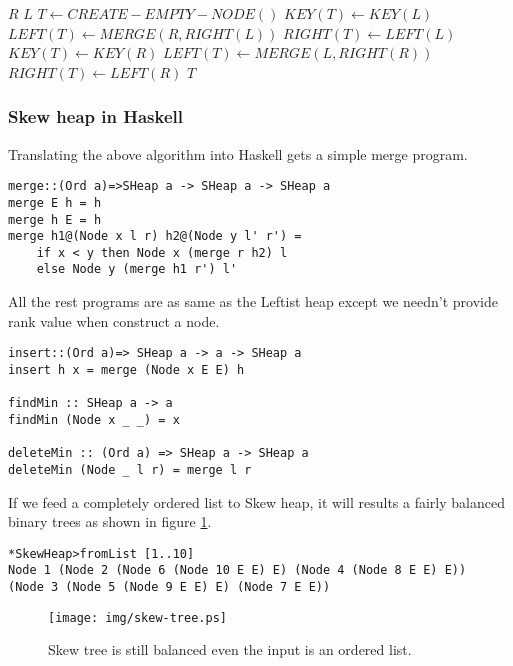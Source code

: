 \documentclass{article}
\begin{document}
\begin{algorithmic}[1]
    \State \Return $R$
    \State \Return $L$
  \Else
    \State $T \gets CREATE-EMPTY-NODE()$
      \State $KEY(T) \gets KEY(L)$
      \State $LEFT(T) \gets MERGE(R, RIGHT(L))$
      \State $RIGHT(T) \gets LEFT(L)$
    \Else
      \State $KEY(T) \gets KEY(R)$
      \State $LEFT(T) \gets MERGE(L, RIGHT(R))$
      \State $RIGHT(T) \gets LEFT(R)$
    \EndIf
    \State \Return $T$
  \EndIf
\EndFunction
\end{algorithmic}

\subsubsection*{Skew heap in Haskell}

Translating the above algorithm into Haskell gets a simple merge program.

\lstset{language=Haskell}
\begin{lstlisting}
merge::(Ord a)=>SHeap a -> SHeap a -> SHeap a
merge E h = h
merge h E = h
merge h1@(Node x l r) h2@(Node y l' r') =
    if x < y then Node x (merge r h2) l
    else Node y (merge h1 r') l'
\end{lstlisting}

All the rest programs are as same as the Leftist heap except we needn't
provide rank value when construct a node.

\begin{lstlisting}
insert::(Ord a)=> SHeap a -> a -> SHeap a
insert h x = merge (Node x E E) h

findMin :: SHeap a -> a
findMin (Node x _ _) = x

deleteMin :: (Ord a) => SHeap a -> SHeap a
deleteMin (Node _ l r) = merge l r
\end{lstlisting}

If we feed a completely ordered list to Skew heap, it will results a
fairly balanced binary trees as shown in figure \ref{fig:skew-tree}.

\begin{lstlisting}
*SkewHeap>fromList [1..10]
Node 1 (Node 2 (Node 6 (Node 10 E E) E) (Node 4 (Node 8 E E) E))
(Node 3 (Node 5 (Node 9 E E) E) (Node 7 E E))
\end{lstlisting}

\begin{figure}[htbp]
   \begin{center}
   	  \texttt{[image: img/skew-tree.ps]}
    \caption{Skew tree is still balanced even the input is an ordered list.} \label{fig:skew-tree}
   \end{center}
\end{figure}
\end{document}
